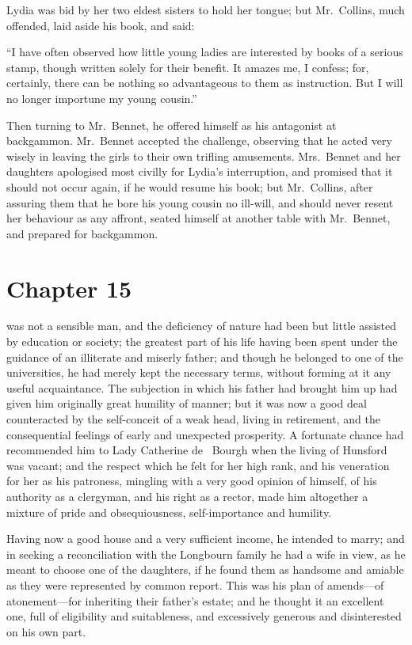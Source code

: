 Lydia was bid by her two eldest sisters to hold her tongue; but
Mr.\ Collins, much offended, laid aside his book, and said:

``I have often observed how little young ladies are interested by
books of a serious stamp, though written solely for their benefit.
It amazes me, I confess; for, certainly, there can be nothing so
advantageous to them as instruction.  But I will no longer
importune my young cousin.''

Then turning to Mr.\ Bennet, he offered himself as his antagonist
at backgammon.  Mr.\ Bennet accepted the challenge, observing
that he acted very wisely in leaving the girls to their own trifling
amusements.  Mrs.\ Bennet and her daughters apologised most
civilly for Lydia's interruption, and promised that it should not
occur again, if he would resume his book; but Mr.\ Collins, after
assuring them that he bore his young cousin no ill-will, and
should never resent her behaviour as any affront, seated himself
at another table with Mr.\ Bennet, and prepared for backgammon.



\chapter{Chapter 15}


 was not a sensible man, and the deficiency of nature
had been but little assisted by education or society; the greatest
part of his life having been spent under the guidance of an
illiterate and miserly father; and though he belonged to one of
the universities, he had merely kept the necessary terms, without
forming at it any useful acquaintance.  The subjection in which
his father had brought him up had given him originally great
humility of manner; but it was now a good deal counteracted by
the self-conceit of a weak head, living in retirement, and the
consequential feelings of early and unexpected prosperity.  A
fortunate chance had recommended him to Lady Catherine de~%
Bourgh when the living of Hunsford was vacant; and the respect
which he felt for her high rank, and his veneration for her as his
patroness, mingling with a very good opinion of himself, of his
authority as a clergyman, and his right as a rector, made him
altogether a mixture of pride and obsequiousness,
self-importance and humility.

Having now a good house and a very sufficient income, he
intended to marry; and in seeking a reconciliation with the
Longbourn family he had a wife in view, as he meant to choose
one of the daughters, if he found them as handsome and amiable
as they were represented by common report.  This was his plan
of amends---of atonement---for inheriting their father's estate;
and he thought it an excellent one, full of eligibility and
suitableness, and excessively generous and disinterested on his
own part.

